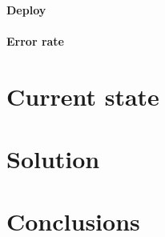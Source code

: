 \documentclass[conference]{IEEEtran}
\begin{document}
\paragraph{Deploy}
\paragraph{Error rate}

\section{Current state}

\section{Solution}

\section{Conclusions}
\end{document}
